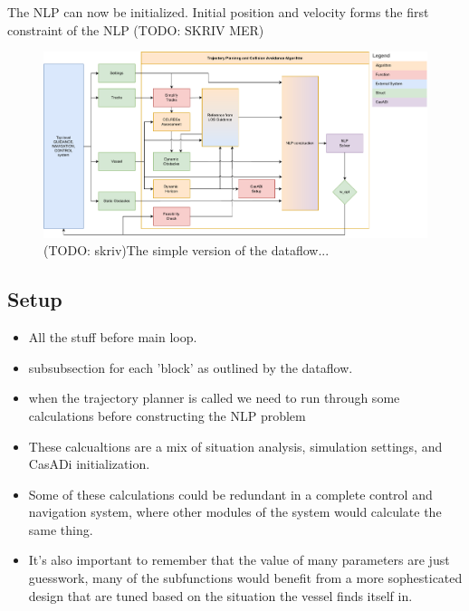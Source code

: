 The \gls{NLP} can now be initialized. Initial position and velocity forms the first constraint of the \gls{NLP} (TODO: SKRIV MER)




\begin{figure}
    \includegraphics[width=\textwidth]{Images/SimpleSystem.pdf}
    \caption{(TODO: skriv)The simple version of the dataflow...}
    \label{FIG: Dataflow chart}
\end{figure}

\subsection{Setup}
\begin{itemize}
    \item All the stuff before main loop.
    \item subsubsection for each 'block' as outlined by the dataflow.
\end{itemize}

\begin{itemize}
    \item when the trajectory planner is called we need to run through some calculations before constructing the NLP problem
    \item These calcualtions are a mix of situation analysis, simulation settings, and CasADi initialization.
    \item Some of these calculations could be redundant in a complete control and navigation system,
    where other modules of the system would calculate the same thing.
    \item It's also important to remember that the value of many parameters are just guesswork, many of the subfunctions
    would benefit from a more sophesticated design that are tuned based on the situation the vessel finds itself in.
\end{itemize}


